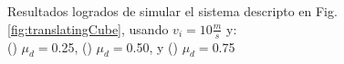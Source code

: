 \documentclass{article}
\begin{document}
\begin{figure}[H]%
  \centering
  \\
  \\
  \captionsetup{justification=centering}
  \caption{Resultados logrados de simular el sistema descripto en Fig. \ref{fig:translatingCube}, usando $v_i = 10 \frac{m}{s}$ y: \\ (\protect{}) $\mu_d=$0.25, (\protect{}) $\mu_d=$0.50, y (\protect{}) $\mu_d=$0.75}%
  \label{fig1} %
\end{figure}
\end{document}
